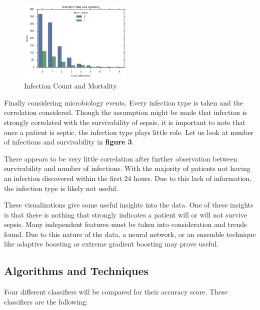 \documentclass[11pt]{article}
\begin{document}
\begin{figure}
	\begin{center}
		\includegraphics[width=0.48\textwidth]{bio_graph.png}
	\end{center}
	\caption{Infection Count and Mortality}
\end{figure}

Finally considering microbiology events. Every infection type is taken and the correlation considered. Though the assumption might be made that infection is strongly correlated with the survivability of sepsis, it is important to note that once a patient is septic, the infection type plays little role. Let us look at number of infections and survivability in \textbf{figure 3}.

There appears to be very little correlation after further observation between survivability and number of infections. With the majority of patients not having an infection discovered within the first 24 hours. Due to this lack of information, the infection type is likely not useful. 

These visualizations give some useful insights into the data. One of these insights is that there is nothing that strongly indicates a patient will or will not survive sepsis. Many independent features must be taken into consideration and trends found. Due to this nature of the data, a neural network, or an ensemble technique like adaptive boosting or extreme gradient boosting may prove useful. 



\subsection{Algorithms and Techniques}
Four different classifiers will be compared for their accuracy score. These classifiers are the following:
\end{document}
